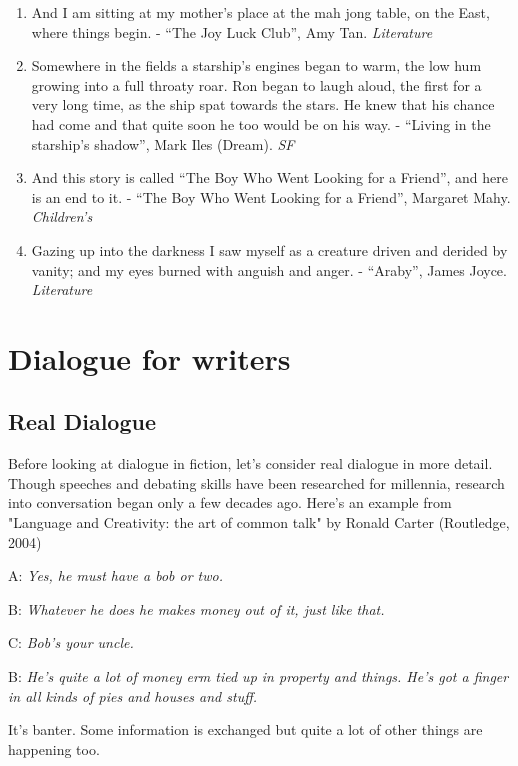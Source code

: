\documentclass[11pt]{article}
\newenvironment{narrow}[2]{%
 \begin{list}{}{%
  \setlength{\topsep}{0pt}%
  \setlength{\leftmargin}{#1}%
  \setlength{\rightmargin}{#2}%
  \setlength{\listparindent}{\parindent}%
  \setlength{\itemindent}{\parindent}%
  \setlength{\parsep}{\parskip}%
 }%
\item[]}{\end{list}}
\begin{document}
\begin{enumerate}
\item And I am sitting at my mother's place at the mah jong table, on the East,
where things begin. - ``The Joy Luck Club'', Amy Tan. \textit{Literature}


\item Somewhere in the fields a starship's engines began to warm, the low hum
growing into a full throaty roar. Ron began to laugh aloud, the first for a
very long time, as the ship spat towards the stars. He knew that his chance
had come and that quite soon he too would be on his way. - ``Living in the starship's shadow'', Mark Iles (Dream). \textit{SF}

\item And this story is called ``The Boy Who Went Looking for a Friend'', and here
is an end to it. - ``The Boy Who Went Looking for a Friend'', Margaret Mahy. \textit{Children's} 
\item Gazing up into the darkness I saw myself as a creature driven and derided by vanity; and my eyes burned with anguish and anger. - ``Araby'', James Joyce.  \textit{Literature}
\end{enumerate}



\newpage
\section{Dialogue for writers }
\subsection*{Real Dialogue}
Before looking at dialogue in fiction, let's consider real dialogue in more detail. Though speeches and debating skills have been researched for millennia, research into conversation began only a few decades  ago. Here's an example from "Language and Creativity: the art of common talk" by Ronald Carter (Routledge, 2004)

\begin{narrow}{1.0cm}{1.0cm}
A: \textit{Yes, he must have a bob or two.}

B:  \textit{Whatever he does he makes money out of it, just like that.}

C:  \textit{Bob's your uncle.}

B:  \textit{He's quite a lot of money erm tied up in property and things. 
   He's got a finger in all kinds of pies and houses and stuff.}
\end{narrow}
It's banter. Some information is exchanged but quite a lot of other things are happening too.
\end{document}
